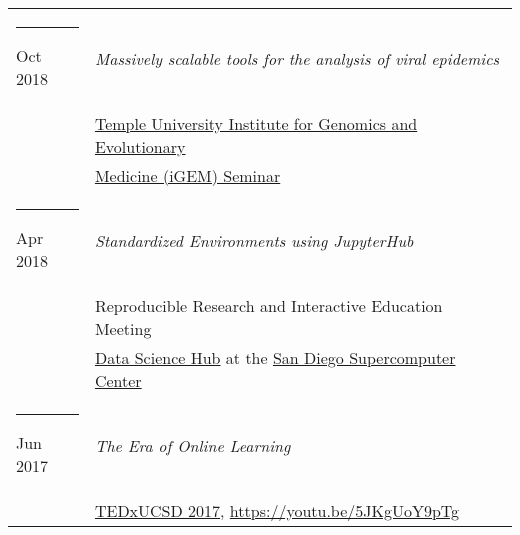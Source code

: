 \documentclass[margin,line]{res}
\begin{document}
\begin{resume}
\begin{longtable}{@{}p{0.7in}p{4in}}
\hspace*{-4mm} \rule{-1mm}{5mm} Oct 2018 & \textit{Massively scalable tools for the analysis of viral epidemics}\\*
\hspace*{-4mm} & \hspace{4mm} \href{http://igem.temple.edu/home}{Temple University Institute for Genomics and Evolutionary}\\*
\hspace*{-4mm} & \hspace{4mm} \href{http://igem.temple.edu/home}{Medicine (iGEM) Seminar}\\
\hspace*{-4mm} \rule{-1mm}{5mm} Apr 2018 & \textit{Standardized Environments using JupyterHub}\\*
\hspace*{-4mm} & \hspace{4mm} Reproducible Research and Interactive Education Meeting\\*
\hspace*{-4mm} & \hspace{4mm} \href{https://datascience.sdsc.edu/}{Data Science Hub} at the \href{https://www.sdsc.edu/}{San Diego Supercomputer Center}\\
\hspace*{-4mm} \rule{-1mm}{5mm} Jun 2017 & \textit{The Era of Online Learning}\\*
\hspace*{-4mm} & \hspace{4mm} \href{http://2017.tedxucsd.com/}{TEDxUCSD 2017}, \href{https://youtu.be/5JKgUoY9pTg}{https://youtu.be/5JKgUoY9pTg}\\
\end{longtable}


\end{resume}
\end{document}
